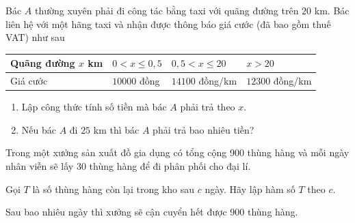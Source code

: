 \begin{bt}%
	Bác $A$ thường xuyên phải đi công tác bằng taxi với quãng đường trên $20$ km. Bác liên hệ với một hãng taxi và nhận được thông báo giá cước (đã bao gồm thuế VAT) như sau
	\begin{center}
		\begin{tabular}{*{4}{|>{\centering\arraybackslash}m{3.5cm}}|}
			\hline
			Quãng đường $x$ km & $0<x\leq 0{,}5$ & $0{,}5<x\leq 20$ & $x>20$\\
			\hline
			Giá cước & $10000$ đồng & $14100$ đồng/km & $12300$ đồng/km\\
			\hline
		\end{tabular}
	\end{center}
	\begin{enumerate}
		\item Lập công thức tính số tiền mà bác $A$ phải trả theo $x$.
		\item Nếu bác $A$ đi $25$ km thì bác $A$ phải trả bao nhiêu tiền?
	\end{enumerate}
\end{bt}

\begin{bt}%
	Trong một xưởng sản xuất đồ gia dụng có tổng cộng 900 thùng hàng và mỗi ngày nhân viễn sẽ lấy 30 thùng hàng để đi phân phối cho đại lí.
	\begin{listEX}[1]
		\item Gọi $T$ là số thùng hàng còn lại trong kho sau $c$ ngày. Hãy lập hàm số $T$ theo $c$.
		\item Sau bao nhiêu ngày thì xưởng sẽ cận cuyển hết được 900 thùng hàng.
	\end{listEX}
\end{bt}

